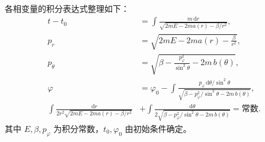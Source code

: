 \begin{question}
\begin{solution}
各相变量的积分表达式整理如下：
\[
\boxed{\;
\begin{aligned}
t-t_0&=\int\frac{m\,\mathrm dr}
{\sqrt{2mE-2m a(r)-\beta/r^2}},\\[6pt]
p_r&=\sqrt{2mE-2m a(r)-\frac{\beta}{r^2}},\\[6pt]
p_\theta&=\sqrt{\beta-\frac{p_\varphi^2}{\sin^2\theta}-2m\,b(\theta)},\\[6pt]
\varphi&=\varphi_0-\int\frac{p_\varphi\,\mathrm d\theta/\sin^2\theta}
{\sqrt{\beta-p_\varphi^2/\sin^2\theta-2m\,b(\theta)}},\\[6pt]
\int\frac{\mathrm dr}{2r^2\sqrt{2mE-2m a(r)-\beta/r^2}}
&+\int\frac{\mathrm d\theta}{2\sqrt{\beta-p_\varphi^2/\sin^2\theta-2m\,b(\theta)}}
=\text{常数}.
\end{aligned}
\;}
\]
其中 \(E,\beta,p_\varphi\) 为积分常数，\(t_0,\varphi_0\) 由初始条件确定。
\end{solution}
\end{question}

